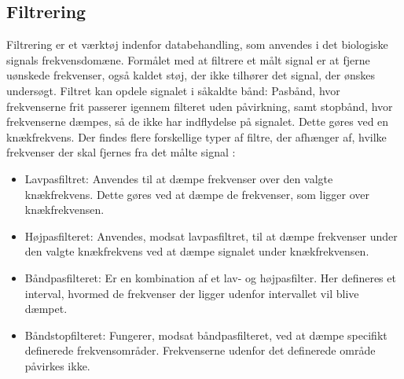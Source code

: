 \subsection{Filtrering}
Filtrering er et værktøj indenfor databehandling, som anvendes i det biologiske signals frekvensdomæne. Formålet med at filtrere et målt signal er at fjerne uønskede frekvenser, også kaldet støj, der ikke tilhører det signal, der ønskes undersøgt. Filtret kan opdele signalet i såkaldte bånd: Pasbånd, hvor frekvenserne frit passerer igennem filteret uden påvirkning, samt stopbånd, hvor frekvenserne dæmpes, så de ikke har indflydelse på signalet. Dette gøres ved en knækfrekvens.
Der findes flere forskellige typer af filtre, der afhænger af, hvilke frekvenser der skal fjernes fra det målte signal \cite{Devasahayam2000}:

\begin{itemize}
	\item Lavpasfiltret: Anvendes til at dæmpe frekvenser over den valgte knækfrekvens. Dette gøres ved at dæmpe de frekvenser, som ligger over knækfrekvensen.
	\item Højpasfilteret: Anvendes, modsat lavpasfiltret, til at dæmpe frekvenser under den valgte knækfrekvens ved at dæmpe signalet under knækfrekvensen.
	\item Båndpasfilteret: Er en kombination af et lav- og højpasfilter.  Her defineres et interval, hvormed de frekvenser der ligger udenfor intervallet vil blive dæmpet.
	\item Båndstopfilteret: Fungerer, modsat båndpasfilteret, ved at dæmpe specifikt definerede frekvensområder. Frekvenserne udenfor det definerede område påvirkes ikke. 
\end{itemize}
  
